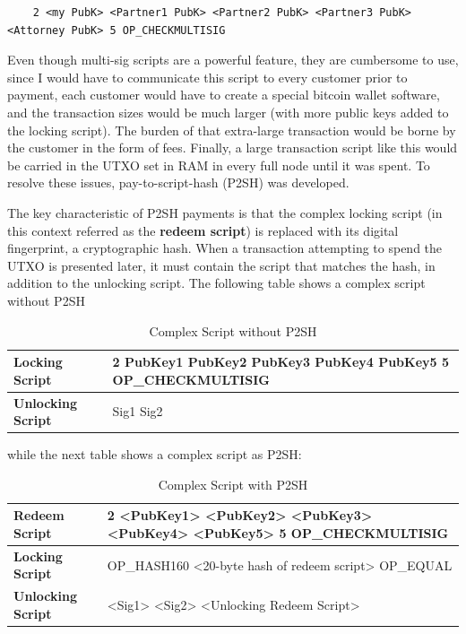 \documentclass{article}
\begin{document}
    \begin{lstlisting}
    2 <my PubK> <Partner1 PubK> <Partner2 PubK> <Partner3 PubK> <Attorney PubK> 5 OP_CHECKMULTISIG
    \end{lstlisting}

    Even though multi-sig scripts are a powerful feature, they are cumbersome to use, since I would have to communicate this script to every customer prior to payment, each customer would have to create a special bitcoin wallet software, and the transaction sizes would be much larger (with more public keys added to the locking script). The burden of that extra-large transaction would be borne by the customer in the form of fees. Finally, a large transaction script like this would be carried in the UTXO set in RAM in every full node until it was spent. To resolve these issues, pay-to-script-hash (P2SH) was developed.

    The key characteristic of P2SH payments is that the complex locking script (in this context referred as the \textbf{redeem script}) is replaced with its digital fingerprint, a cryptographic hash. When a transaction attempting to spend the UTXO is presented later, it must contain the script that matches the hash, in addition to the unlocking script. The following table shows a complex script without P2SH

    \begin{table}[H]
    \centering
    \begin{tabular}{|l|l|}
    \hline
    \textbf{Locking Script} & 2 PubKey1 PubKey2 PubKey3 PubKey4 PubKey5 5 OP\_CHECKMULTISIG \\
    \hline
    \textbf{Unlocking Script} & Sig1 Sig2 \\
    \hline
    \end{tabular}
    \caption{Complex Script without P2SH}
    \end{table}

    while the next table shows a complex script as P2SH:

    \begin{table}[H]
    \centering
    \begin{tabular}{|l|l|}
    \hline
    \textbf{Redeem Script} & 2 <PubKey1> <PubKey2> <PubKey3> <PubKey4> <PubKey5> 5 OP\_CHECKMULTISIG \\
    \hline
    \textbf{Locking Script} & OP\_HASH160 <20-byte hash of redeem script> OP\_EQUAL \\
    \hline
    \textbf{Unlocking Script} & <Sig1> <Sig2> <Unlocking Redeem Script> \\
    \hline
    \end{tabular}
    \caption{Complex Script with P2SH}
    \end{table}
\end{document}
